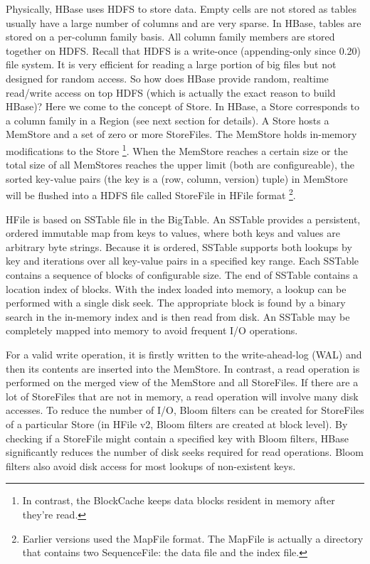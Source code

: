 \documentclass[11pt]{book}
\begin{document}
Physically, HBase uses HDFS to store data. Empty cells are not stored as tables usually have a large number of columns and are very sparse. In HBase, tables are stored on a per-column family basis. All column family members are stored together on HDFS. 
Recall that HDFS is a write-once (appending-only since 0.20) file system. It is very efficient for reading a large portion of  big files but not designed for random access. So how does HBase provide random, realtime read/write access on top HDFS (which is actually the exact reason to build HBase)? Here we come to the concept of Store. In HBase, a Store corresponds to a column family in a Region (see next section for details). A Store hosts a MemStore and a set of zero or more StoreFiles. The MemStore holds in-memory modifications to the Store \footnote{In contrast, the BlockCache keeps data blocks resident in memory after they're read.}. When the MemStore reaches a certain size or the total size of all MemStores reaches the upper limit (both are configureable), the sorted key-value pairs (the key is a (row, column, version) tuple) in MemStore will be flushed into a HDFS file called StoreFile in HFile format \footnote{Earlier versions used the MapFile format. The MapFile is actually a directory that contains two SequenceFile: the data file and the index file. }.

HFile is based on SSTable file in the BigTable. An SSTable provides a persistent, ordered immutable map from keys to values, where both keys and values are arbitrary byte strings. Because it is ordered, SSTable supports both lookups by key and iterations over all key-value pairs in a specified key range. Each SSTable contains a sequence of blocks of configurable size. The end of SSTable contains a location index of blocks. With the index loaded into memory, a lookup can be performed with a single disk seek. The appropriate block is found by a binary search in the in-memory index and is then read from disk. An SSTable may be completely mapped into memory to avoid frequent I/O operations.

For a valid write operation, it is firstly written to the write-ahead-log (WAL) and then its contents are inserted into the MemStore. In contrast, a read operation is performed on the merged view of the MemStore and all StoreFiles. If there are a lot of StoreFiles that are not in memory, a read operation will involve many disk accesses. To reduce the number of I/O, Bloom filters \cite{Bloom:1970:STH} can be created for StoreFiles of a particular Store (in HFile v2, Bloom filters are created at block level). By checking if a StoreFile might contain a specified key with Bloom filters, HBase significantly reduces the number of disk seeks required for read operations. Bloom filters also avoid disk access for most lookups of non-existent keys.
\end{document}
